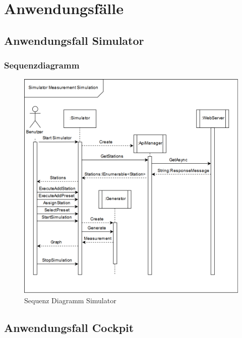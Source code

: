 \section{Anwendungsfälle}
\subsection{Anwendungsfall Simulator}

\subsubsection{Sequenzdiagramm}

\begin{figure}[H]
\centering
\includegraphics[width=\textwidth]{pictures/sequence/Sequence_simulator_full.png}
\caption{Sequenz Diagramm Simulator}
\label{fig:Wetr.Simulator.Wpf-sequence}
\end{figure}
\raggedright

\subsection{Anwendungsfall Cockpit}